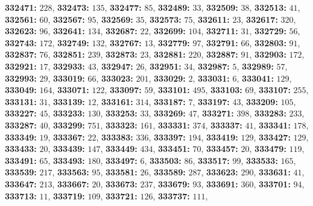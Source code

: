 \textsf{\bfseries 332471:} $228$, \textsf{\bfseries 332473:} $135$, \textsf{\bfseries 332477:} $85$, \textsf{\bfseries 332489:} $33$, \textsf{\bfseries 332509:} $38$, \textsf{\bfseries 332513:} $41$, \textsf{\bfseries 332561:} $60$, \textsf{\bfseries 332567:} $95$, \textsf{\bfseries 332569:} $35$, \textsf{\bfseries 332573:} $75$, \textsf{\bfseries 332611:} $23$, \textsf{\bfseries 332617:} $320$, \textsf{\bfseries 332623:} $96$, \textsf{\bfseries 332641:} $134$, \textsf{\bfseries 332687:} $22$, \textsf{\bfseries 332699:} $104$, \textsf{\bfseries 332711:} $31$, \textsf{\bfseries 332729:} $56$, \textsf{\bfseries 332743:} $172$, \textsf{\bfseries 332749:} $132$, \textsf{\bfseries 332767:} $13$, \textsf{\bfseries 332779:} $97$, \textsf{\bfseries 332791:} $66$, \textsf{\bfseries 332803:} $91$, \textsf{\bfseries 332837:} $76$, \textsf{\bfseries 332851:} $239$, \textsf{\bfseries 332873:} $23$, \textsf{\bfseries 332881:} $220$, \textsf{\bfseries 332887:} $91$, \textsf{\bfseries 332903:} $172$, \textsf{\bfseries 332921:} $17$, \textsf{\bfseries 332933:} $43$, \textsf{\bfseries 332947:} $26$, \textsf{\bfseries 332951:} $34$, \textsf{\bfseries 332987:} $5$, \textsf{\bfseries 332989:} $57$, \textsf{\bfseries 332993:} $29$, \textsf{\bfseries 333019:} $66$, \textsf{\bfseries 333023:} $201$, \textsf{\bfseries 333029:} $2$, \textsf{\bfseries 333031:} $6$, \textsf{\bfseries 333041:} $129$, \textsf{\bfseries 333049:} $164$, \textsf{\bfseries 333071:} $122$, \textsf{\bfseries 333097:} $59$, \textsf{\bfseries 333101:} $495$, \textsf{\bfseries 333103:} $69$, \textsf{\bfseries 333107:} $255$, \textsf{\bfseries 333131:} $31$, \textsf{\bfseries 333139:} $12$, \textsf{\bfseries 333161:} $314$, \textsf{\bfseries 333187:} $7$, \textsf{\bfseries 333197:} $43$, \textsf{\bfseries 333209:} $105$, \textsf{\bfseries 333227:} $45$, \textsf{\bfseries 333233:} $130$, \textsf{\bfseries 333253:} $33$, \textsf{\bfseries 333269:} $47$, \textsf{\bfseries 333271:} $398$, \textsf{\bfseries 333283:} $233$, \textsf{\bfseries 333287:} $40$, \textsf{\bfseries 333299:} $751$, \textsf{\bfseries 333323:} $161$, \textsf{\bfseries 333331:} $374$, \textsf{\bfseries 333337:} $41$, \textsf{\bfseries 333341:} $178$, \textsf{\bfseries 333349:} $19$, \textsf{\bfseries 333367:} $22$, \textsf{\bfseries 333383:} $336$, \textsf{\bfseries 333397:} $194$, \textsf{\bfseries 333419:} $129$, \textsf{\bfseries 333427:} $129$, \textsf{\bfseries 333433:} $20$, \textsf{\bfseries 333439:} $147$, \textsf{\bfseries 333449:} $434$, \textsf{\bfseries 333451:} $70$, \textsf{\bfseries 333457:} $20$, \textsf{\bfseries 333479:} $119$, \textsf{\bfseries 333491:} $65$, \textsf{\bfseries 333493:} $180$, \textsf{\bfseries 333497:} $6$, \textsf{\bfseries 333503:} $86$, \textsf{\bfseries 333517:} $99$, \textsf{\bfseries 333533:} $165$, \textsf{\bfseries 333539:} $217$, \textsf{\bfseries 333563:} $95$, \textsf{\bfseries 333581:} $26$, \textsf{\bfseries 333589:} $287$, \textsf{\bfseries 333623:} $290$, \textsf{\bfseries 333631:} $41$, \textsf{\bfseries 333647:} $213$, \textsf{\bfseries 333667:} $20$, \textsf{\bfseries 333673:} $237$, \textsf{\bfseries 333679:} $93$, \textsf{\bfseries 333691:} $360$, \textsf{\bfseries 333701:} $94$, \textsf{\bfseries 333713:} $11$, \textsf{\bfseries 333719:} $109$, \textsf{\bfseries 333721:} $126$, \textsf{\bfseries 333737:} $111$, 
